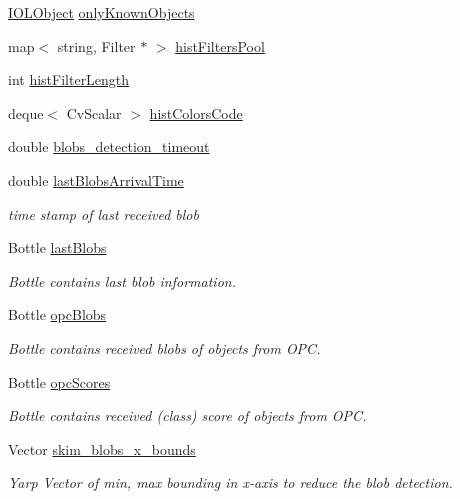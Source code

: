 \begin{DoxyCompactItemize}
\hyperlink{group__iol2opc_classIOLObject}{I\+O\+L\+Object} \hyperlink{group__iol2opc_a1a161477a0a2d6a12e47abe090082f42}{only\+Known\+Objects}
\item 
map$<$ string, Filter $\ast$ $>$ \hyperlink{group__iol2opc_aa5dc576e1ea8f255865910b586c75914}{hist\+Filters\+Pool}
\item 
int \hyperlink{group__iol2opc_ac4cfcd6af9e5dcf3f3d463a31b478fbb}{hist\+Filter\+Length}
\item 
deque$<$ Cv\+Scalar $>$ \hyperlink{group__iol2opc_ad0047567208e337c4c8007d7a0d0ad59}{hist\+Colors\+Code}
\item 
double \hyperlink{group__iol2opc_a253b67fea52b3d0a697ae82bcf63b201}{blobs\+\_\+detection\+\_\+timeout}
\item 
double \hyperlink{group__iol2opc_a5718f234d5aa14378bceb65b8cc68e0a}{last\+Blobs\+Arrival\+Time}
\begin{DoxyCompactList}\small\item\em time stamp of last received blob \end{DoxyCompactList}\item 
Bottle \hyperlink{group__iol2opc_a7755982592a2045ad9c7558e5ca61548}{last\+Blobs}
\begin{DoxyCompactList}\small\item\em Bottle contains last blob information. \end{DoxyCompactList}\item 
Bottle \hyperlink{group__iol2opc_a8cb45af99e75edd2c75f5a4832680e5d}{opc\+Blobs}
\begin{DoxyCompactList}\small\item\em Bottle contains received blobs of objects from O\+PC. \end{DoxyCompactList}\item 
Bottle \hyperlink{group__iol2opc_a9318b4bf7afa7a742fe7e1e8834addd3}{opc\+Scores}
\begin{DoxyCompactList}\small\item\em Bottle contains received (class) score of objects from O\+PC. \end{DoxyCompactList}\item 
Vector \hyperlink{group__iol2opc_ab98ac03446e16344588dcb9e208e9785}{skim\+\_\+blobs\+\_\+x\+\_\+bounds}
\begin{DoxyCompactList}\small\item\em Yarp Vector of min, max bounding in x-\/axis to reduce the blob detection. \end{DoxyCompactList}\item 

\end{DoxyCompactItemize}
